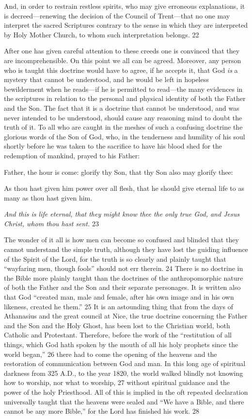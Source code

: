 And, in order to restrain restless spirits, who may give erroneous explanations, it is
decreed—renewing the decision of the Council of Trent—that no one may interpret the
sacred Scriptures contrary to the sense in which they are interpreted by Holy Mother Church,
to whom such interpretation belongs. 22

After one has given careful attention to these creeds one is convinced that they are
incomprehensible. On this point we all can be agreed. Moreover, any person who is taught
this doctrine would have to agree, if he accepts it, that God \textit{is} a mystery that cannot be
understood, and he would be left in hopeless bewilderment when he reads—if he is permitted
to read—the many evidences in the scriptures in relation to the personal and physical identity
of both the Father and the Son. The fact that it is a doctrine that cannot be understood, and
was never intended to be understood, should cause any reasoning mind to doubt the truth of
it. To all who are caught in the meshes of such a confusing doctrine the glorious words of the
Son of God, who, in the tenderness and humility of his soul shortly before he was taken to
the sacrifice to have his blood shed for the redemption of mankind, prayed to his Father:

Father, the hour is come: glorify thy Son, that thy Son also may glorify thee:

As thou hast given him power over all flesh, that he should give eternal life to as many as
thou hast given him.

\textit{And this is life eternal, that they might know thee the only true God, and Jesus Christ, whom
thou hast sent.} 23

The wonder of it all is how men can become so confused and blinded that they cannot
understand the simple truth, although they have lost the guiding influence of the Spirit of the
Lord, for the truth is so clearly and plainly taught that ``wayfaring men, though fools'' should
not err therein. 24 There is no doctrine in the Bible more plainly taught than the doctrines of
the anthropomorphic nature of both the Father and the Son and their separate personages. It is
written also that God ``created man, male and female, after his own image and in his own
likeness, created he them.'' 25 It is an astounding thing that from the days of Athanasius and
the great council at Nice, the true doctrine concerning the Father and the Son and the Holy
Ghost, has been lost to the Christian world, both Catholic and Protestant. Therefore, before
the work of the ``restitution of all things, which God hath spoken by the mouth of all his holy
prophets since the world began,'' 26 there had to come the opening of the heavens and the
restoration of communication between God and man. In this long age of spiritual darkness
from 325 A.D., to the year 1820, the world walked blindly not knowing how to worship, nor
what to worship, 27 without spiritual guidance and the power of the holy Priesthood. All of
this is implied in the oft repeated declaration universally taught that the heavens were sealed
and ``We have a Bible, and there cannot be any more Bible,'' for the Lord has finished his
work. 28

